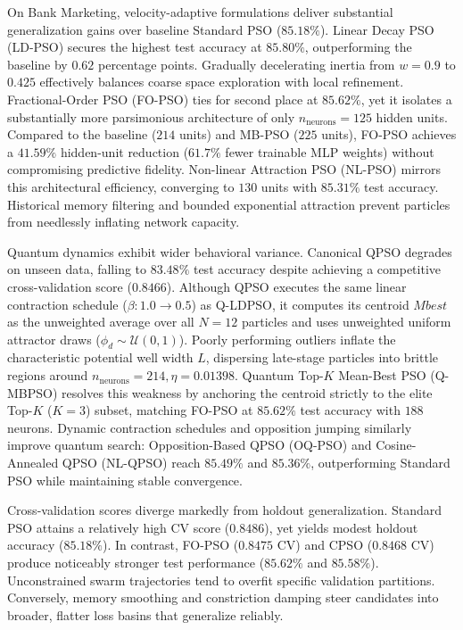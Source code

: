 \documentclass[10pt]{article}
\begin{document}
On Bank Marketing, velocity-adaptive formulations deliver substantial generalization gains over baseline Standard PSO ($85.18\%$). Linear Decay PSO (LD-PSO) secures the highest test accuracy at $85.80\%$, outperforming the baseline by $0.62$ percentage points. Gradually decelerating inertia from $w=0.9$ to $0.425$ effectively balances coarse space exploration with local refinement. Fractional-Order PSO (FO-PSO) ties for second place at $85.62\%$, yet it isolates a substantially more parsimonious architecture of only $n_{\mathrm{neurons}} = 125$ hidden units. Compared to the baseline ($214$ units) and MB-PSO ($225$ units), FO-PSO achieves a $41.59\%$ hidden-unit reduction ($61.7\%$ fewer trainable MLP weights) without compromising predictive fidelity. Non-linear Attraction PSO (NL-PSO) mirrors this architectural efficiency, converging to $130$ units with $85.31\%$ test accuracy. Historical memory filtering and bounded exponential attraction prevent particles from needlessly inflating network capacity.

Quantum dynamics exhibit wider behavioral variance. Canonical QPSO degrades on unseen data, falling to $83.48\%$ test accuracy despite achieving a competitive cross-validation score ($0.8466$). Although QPSO executes the same linear contraction schedule ($\beta: 1.0 \to 0.5$) as Q-LDPSO, it computes its centroid $Mbest$ as the unweighted average over all $N=12$ particles and uses unweighted uniform attractor draws ($\phi_d \sim \mathcal{U}(0,1)$). Poorly performing outliers inflate the characteristic potential well width $L$, dispersing late-stage particles into brittle regions around $n_{\mathrm{neurons}}=214, \eta=0.01398$. Quantum Top-$K$ Mean-Best PSO (Q-MBPSO) resolves this weakness by anchoring the centroid strictly to the elite Top-$K$ ($K=3$) subset, matching FO-PSO at $85.62\%$ test accuracy with $188$ neurons. Dynamic contraction schedules and opposition jumping similarly improve quantum search: Opposition-Based QPSO (OQ-PSO) and Cosine-Annealed QPSO (NL-QPSO) reach $85.49\%$ and $85.36\%$, outperforming Standard PSO while maintaining stable convergence.

Cross-validation scores diverge markedly from holdout generalization. Standard PSO attains a relatively high CV score ($0.8486$), yet yields modest holdout accuracy ($85.18\%$). In contrast, FO-PSO ($0.8475$ CV) and CPSO ($0.8468$ CV) produce noticeably stronger test performance ($85.62\%$ and $85.58\%$). Unconstrained swarm trajectories tend to overfit specific validation partitions. Conversely, memory smoothing and constriction damping steer candidates into broader, flatter loss basins that generalize reliably.
\end{document}
